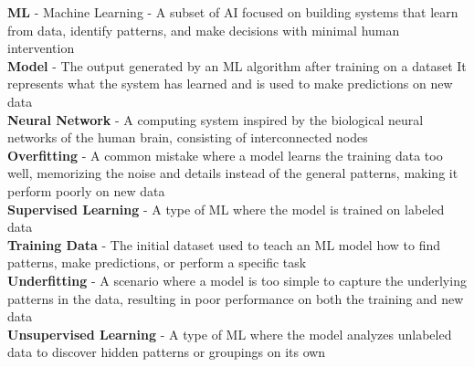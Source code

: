 \begin{singlespace}
\textbf{ML} - Machine Learning - A subset of AI focused on building systems
that learn from data, identify patterns, and make decisions with minimal
human intervention  \\

\textbf{Model} - The output generated by an ML algorithm after training
on a dataset It represents what the system has learned and is used to
make predictions on new data  \\

\textbf{Neural Network} - A computing system inspired by the biological
neural networks of the human brain, consisting of interconnected nodes  \\

\textbf{Overfitting} - A common mistake where a model learns the training
data too well, memorizing the noise and details instead of the general
patterns, making it perform poorly on new data  \\

\textbf{Supervised Learning} - A type of ML where the model is trained
on labeled data  \\

\textbf{Training Data} - The initial dataset used to teach an ML model
how to find patterns, make predictions, or perform a specific task  \\

\textbf{Underfitting} - A scenario where a model is too simple to capture
the underlying patterns in the data, resulting in poor performance on both
the training and new data  \\

\textbf{Unsupervised Learning} - A type of ML where the model analyzes
unlabeled data to discover hidden patterns or groupings on its own  \\

\end{singlespace}
\endgroup
